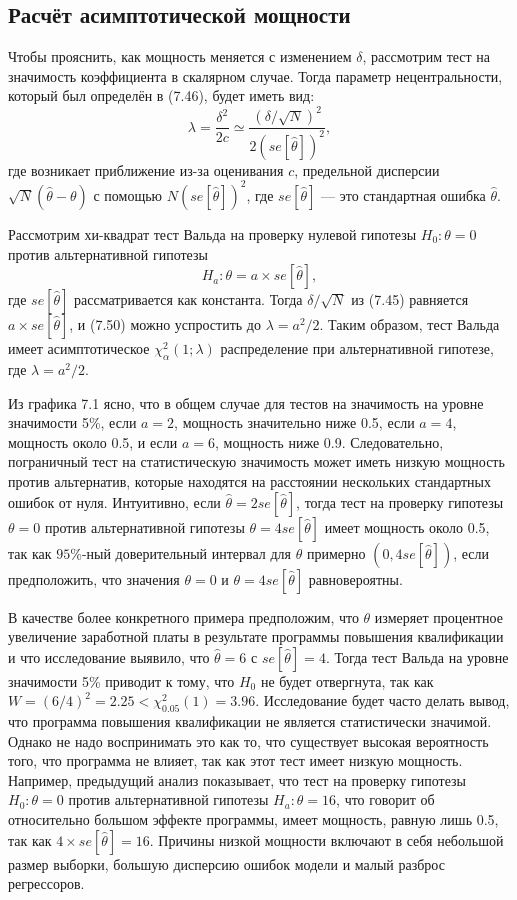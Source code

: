 \subsection{Расчёт асимптотической мощности}

Чтобы прояснить, как мощность меняется с изменением $\delta$, рассмотрим тест на значимость коэффициента в скалярном случае. Тогда параметр нецентральности, который был определён в (7.46), будет иметь вид:
\begin{equation}
\lambda = \frac{\delta^2}{2c} \simeq \frac{(\delta/\sqrt{N})^2}{2(se[\hat{\theta}])^2},
\end{equation}
где возникает приближение из-за оценивания $c$, предельной дисперсии $\sqrt{N}(\hat{\theta} - \theta)$ с помощью $N(se[\hat{\theta}])^2$, где $se[\hat{\theta}]$  --- это стандартная ошибка $\hat{\theta}$.

Рассмотрим хи-квадрат тест Вальда на проверку нулевой гипотезы $H_0: \theta = 0$ против альтернативной гипотезы
\[
H_a: \theta = a \times se[\hat{\theta}],
\]
где $se[\hat{\theta}]$ рассматривается как константа. Тогда $\delta/\sqrt{N}$ из (7.45) равняется $a \times se[\hat{\theta}]$, и (7.50) можно успростить до $\lambda = a^2/2$. Таким образом, тест Вальда имеет асимптотическое $\chi_{\alpha}^2(1; \lambda)$ распределение при альтернативной гипотезе, где $\lambda = a^2/2$.

Из графика 7.1 ясно, что в общем случае для тестов на значимость на уровне значимости 5\%,
если $a = 2$, мощность значительно ниже 0.5, если $a = 4$, мощность около 0.5, и если $a = 6$,
мощность ниже 0.9. Следовательно, пограничный тест на статистическую значимость может иметь низкую мощность против альтернатив, которые находятся на расстоянии нескольких стандартных ошибок от нуля. Интуитивно, если $\hat{\theta} = 2se[\hat{\theta}]$, тогда тест на проверку гипотезы $\theta = 0$ против альтернативной гипотезы $\theta = 4se[\hat{\theta}]$ имеет мощность около 0.5, так как $95\%$-ный доверительный интервал для $\theta$ примерно $(0, 4se[\hat{\theta}])$, если предположить, что значения $\theta = 0$ и $\theta = 4se[\hat{\theta}]$ равновероятны.

В качестве более конкретного примера предположим, что $\theta$ измеряет процентное увеличение заработной платы
в результате программы повышения квалификации и что исследование выявило, что $\hat{\theta} = 6$ с $se[\hat{\theta}] = 4$. Тогда тест Вальда на уровне значимости 5\% приводит к тому, что $H_0$ не будет отвергнута, так как $W = (6/4)^2 = 2.25 < \chi_{0.05}^2(1) = 3.96$. Исследование будет часто делать вывод, что программа повышения квалификации не является статистически значимой. Однако не надо воспринимать это как то, что существует высокая вероятность того, что программа не влияет, так как этот тест имеет низкую мощность. Например, предыдущий анализ показывает, что тест на проверку гипотезы $H_0: \theta = 0$ против альтернативной гипотезы $H_a: \theta = 16$, что говорит об относительно большом эффекте программы, имеет мощность, равную лишь 0.5, так как $4 \times se[\hat{\theta}] = 16$. Причины низкой мощности включают в себя небольшой размер выборки, большую дисперсию ошибок модели и малый разброс регрессоров.

